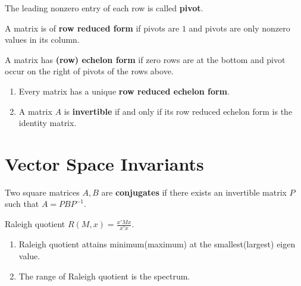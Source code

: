 \begin{definition}
	The leading nonzero entry of each row is called \textbf{pivot}.
\end{definition}
\begin{definition}
	A matrix is of \textbf{row reduced form} if pivots are $1$ and pivots are only nonzero values in its column.
\end{definition}
\begin{definition}
	A matrix has \textbf{(row) echelon form} if zero rows are at the bottom and pivot occur on the right of pivots of the rows above.
\end{definition}
\begin{enumerate}
	\item Every matrix has a unique \textbf{row reduced echelon form}.
	\item A matrix $A$ is \textbf{invertible} if and only if its row reduced echelon form is the identity matrix.
\end{enumerate}
\section{Vector Space Invariants}
\begin{definition}[conjugation]
	Two square matrices $A,B$ are \textbf{conjugates} if there exists an invertible matrix $P$ such that $A = PBP^{-1}$.
\end{definition}

\begin{definition}
	Raleigh quotient $R(M,x) = \frac{x'Mx}{x'x}$.
\end{definition}
\begin{enumerate}	
	\item Raleigh quotient attains minimum(maximum) at the smallest(largest) eigen value.
	\item The range of Raleigh quotient is the spectrum. 
\end{enumerate}	
